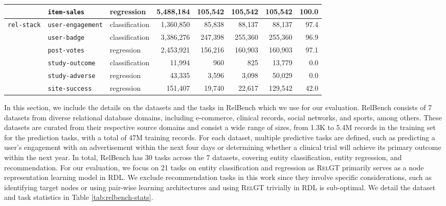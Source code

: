 \documentclass{article} %
\newcommand{\mr}[2]{\multirow{#1}{*}{#2}}
\newcommand{\RelGT}{\textsc{RelGT}\xspace}
\begin{document}
\begin{table}[t]
\begin{tabular}{lllrrrrr}
      & \texttt{item-sales} & regression & 5,488,184 & 105,542 & 105,542 & 105,542 & 100.0  \\
    \midrule
    \mr{5}{\texttt{rel-stack}}
      & \texttt{user-engagement} & classification & 1,360,850 & 85,838 & 88,137 & 88,137 & 97.4  \\
      & \texttt{user-badge} & classification  & 3,386,276 & 247,398 & 255,360 & 255,360 & 96.9  \\
      & \texttt{post-votes} & regression  & 2,453,921 & 156,216 & 160,903 & 160,903 & 97.1  \\
    \midrule
    \mr{5}{\texttt{rel-trial}}
      & \texttt{study-outcome} & classification  & 11,994 & 960 & 825 & 13,779 & 0.0  \\
      & \texttt{study-adverse} & regression  & 43,335 & 3,596 & 3,098 & 50,029 & 0.0  \\
      & \texttt{site-success} & regression  & 151,407 & 19,740 & 22,617 & 129,542 & 42.0  \\
   \bottomrule
  \end{tabular}
\end{table}




In this section, we include the details on the datasets and the tasks in RelBench \citep{robinson2025relbench} which we use for our evaluation. RelBench consists of 7 datasets from diverse relational database domains, including e-commerce, clinical records, social networks, and sports, among others. These datasets are curated from their respective source domains and consist a wide range of sizes, from 1.3K to 5.4M records in the training set for the prediction tasks, with a total of 47M training records. 
For each dataset, multiple predictive tasks are defined, such as predicting a user's engagement with an advertisement within the next four days or determining whether a clinical trial will achieve its primary outcome within the next year. In total, RelBench has 30 tasks across the 7 datasets, covering entity classification, entity regression, and recommendation.
For our evaluation, we focus on 21 tasks on entity classification and regression as \RelGT primarily serves as a node representation learning model in RDL. We exclude recommendation tasks in this work since they involve specific considerations, such as identifying target nodes \citep{you2021identity} or using pair-wise learning architectures \citep{yuan2024contextgnn} and using \RelGT trivially in RDL is sub-optimal. We detail the dataset and task statistics in Table \ref{tab:relbench-stats}. 
\end{document}

